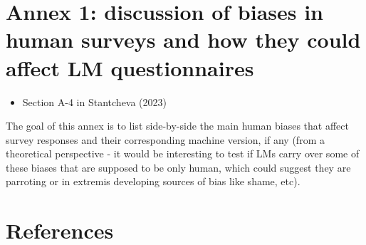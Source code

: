 \documentclass[
]{article}
\providecommand{\tightlist}{%
  \setlength{\itemsep}{0pt}\setlength{\parskip}{0pt}}\usepackage{longtable,booktabs,array}
\begin{document}
\section{Annex 1: discussion of biases in human surveys and how they
could affect LM
questionnaires}\label{annex-1-discussion-of-biases-in-human-surveys-and-how-they-could-affect-lm-questionnaires}

\begin{itemize}
\tightlist
\item
  Section A-4 in Stantcheva (2023)
\end{itemize}

The goal of this annex is to list side-by-side the main human biases
that affect survey responses and their corresponding machine version, if
any (from a theoretical perspective - it would be interesting to test if
LMs carry over some of these biases that are supposed to be only human,
which could suggest they are parroting or in extremis developing sources
of bias like shame, etc).

\section*{References}\label{references}
\end{document}
